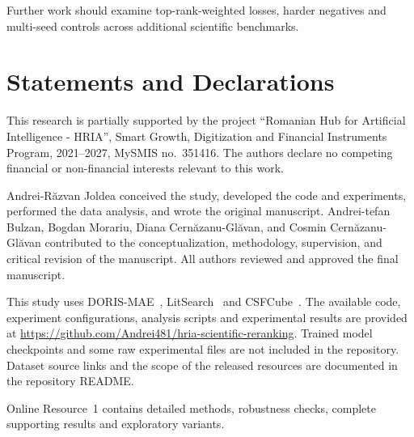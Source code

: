 \documentclass[pdflatex,sn-basic,Numbered]{sn-jnl}%
\theoremstyle{thmstyleone}%
\theoremstyle{thmstyletwo}%
\theoremstyle{thmstylethree}%
\begin{document}
Further work should examine top-rank-weighted losses, harder negatives and
multi-seed controls across additional scientific benchmarks.

\FloatBarrier
\backmatter
\section*{Statements and Declarations}
This research is partially supported by the project
``Romanian Hub for Artificial Intelligence - HRIA'',
Smart Growth, Digitization and Financial Instruments Program,
2021--2027, MySMIS no.~351416.
The authors declare no competing financial or non-financial interests relevant to this work.

Andrei-R\u{a}zvan Joldea conceived the study, developed the code and experiments,
performed the data analysis, and wrote the original manuscript.
Andrei-tefan Bulzan, Bogdan Morariu, Diana Cern\u{a}zanu-Gl\u{a}van,
and Cosmin Cern\u{a}zanu-Gl\u{a}van contributed to the conceptualization,
methodology, supervision, and critical revision of the manuscript.
All authors reviewed and approved the final manuscript.

This study uses DORIS-MAE~\cite{Wang}, LitSearch~\cite{Ajith} and
CSFCube~\cite{Mysore}. The available code, experiment
configurations, analysis scripts and experimental results are provided at
\url{https://github.com/Andrei481/hria-scientific-reranking}.
Trained model checkpoints and some raw experimental files are not included
in the repository. Dataset source links and the scope of the released
resources are documented in the repository README.

Online Resource~1 contains detailed methods, robustness checks, complete supporting results and exploratory variants.


\end{document}
